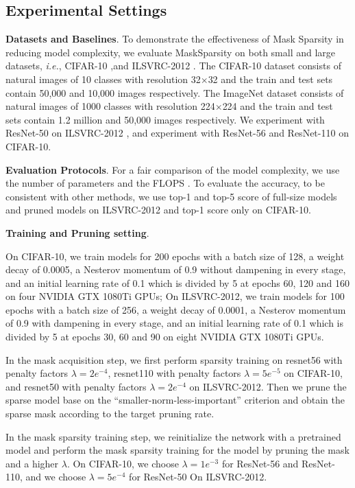 \documentclass[review]{cvpr}
\begin{document}
\subsection{Experimental Settings}

\textbf{Datasets and Baselines}.
To demonstrate the effectiveness of Mask Sparsity in reducing model complexity, we evaluate MaskSparsity on both small and large datasets,  \emph{i.e.}, CIFAR-10 \cite{krizhevsky2009learning} ,and ILSVRC-2012 \cite{russakovsky2015imagenet}. The CIFAR-10 dataset consists of natural images of 10 classes with resolution 32$\times$32 and the train and test sets contain 50,000 and 10,000 images respectively. The ImageNet dataset consists of natural images of 1000 classes with resolution 224$\times$224 and the train and test sets contain 1.2 million and 50,000 images respectively.  We experiment with ResNet-50 \cite{He2016IdentityMI} on ILSVRC-2012 , and experiment with ResNet-56 \cite{he2016deep} and ResNet-110 \cite{he2016deep} on CIFAR-10.

\textbf{Evaluation Protocols}.
For a fair comparison of the model complexity, we use the number of parameters and the FLOPS \cite{he2016deep}. To evaluate the accuracy, to be consistent with other methods, we use top-1 and top-5 score of full-size models and pruned models on ILSVRC-2012 and top-1 score only on CIFAR-10.

\textbf{Training and Pruning setting}.


On CIFAR-10, we train models for 200 epochs with a batch size of 128, a weight decay of 0.0005, a Nesterov momentum of 0.9 without dampening in every stage, and an initial learning rate of 0.1 which is divided by 5 at epochs 60, 120 and 160 on four NVIDIA GTX 1080Ti GPUs; On ILSVRC-2012, we train models for 100 epochs with a batch size of 256, a weight decay of 0.0001, a Nesterov momentum of 0.9 with dampening in every stage, and an initial learning rate of 0.1 which is divided by 5 at epochs 30, 60 and 90 on eight NVIDIA GTX 1080Ti GPUs.

In the mask acquisition step, we first perform sparsity training on resnet56 with penalty factors $\lambda=2e^{-4}$, resnet110 with penalty factors $\lambda=5e^{-5}$ on CIFAR-10, and resnet50 with penalty factors $\lambda=2e^{-4}$ on ILSVRC-2012. Then we prune the sparse model base on the “smaller-norm-less-important” criterion and obtain the sparse mask according to the target pruning rate. 

In the mask sparsity training step, we reinitialize the network with a pretrained model and perform the mask sparsity training for the model by pruning the mask and a higher $\lambda$. On CIFAR-10, we choose $\lambda=1e^{-3}$ for ResNet-56 and ResNet-110, and we choose $\lambda=5e^{-4}$ for ResNet-50 On ILSVRC-2012. 
\end{document}
